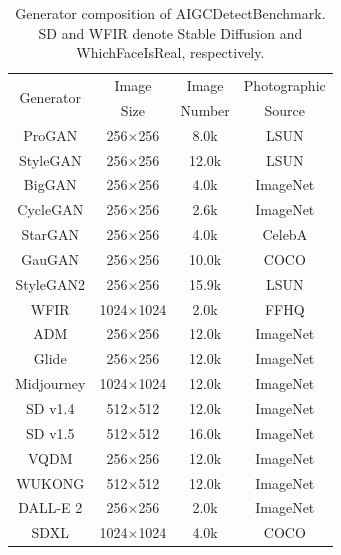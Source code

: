 \documentclass[letterpaper,journal]{IEEEtran}
\begin{document}
\begin{table}[t]
\caption{Generator composition of AIGCDetectBenchmark. SD and WFIR denote Stable Diffusion and WhichFaceIsReal, respectively.}
\label{tab:aigcdetectbenchmark}
\centering
\small
\renewcommand{\arraystretch}{1.04}
\setlength{\tabcolsep}{6pt}
\begin{tabular}{@{}cccc@{}}
\toprule
\multirow{2}{*}{Generator} & Image & Image & Photographic \\
 & Size & Number & Source \\
\midrule
ProGAN \cite{karras2018progan} & 256$\times$256 & 8.0k & LSUN \cite{yu2015lsun} \\
StyleGAN \cite{karras2019stylegan} & 256$\times$256 & 12.0k & LSUN \\
BigGAN \cite{brock2019biggan} & 256$\times$256 & 4.0k & ImageNet \cite{deng2009imagenet} \\
CycleGAN \cite{zhu2017cyclegan} & 256$\times$256 & 2.6k & ImageNet \\
StarGAN \cite{choi2018stargan} & 256$\times$256 & 4.0k & CelebA \cite{liu2015celeba} \\
GauGAN \cite{park2019spade} & 256$\times$256 & 10.0k & COCO \cite{lin2014coco} \\
StyleGAN2 \cite{karras2020stylegan2} & 256$\times$256 & 15.9k & LSUN \\
WFIR \cite{whichfaceisreal2023} & 1024$\times$1024 & 2.0k & FFHQ \cite{karras2019stylegan} \\
ADM \cite{dhariwal2021diffusion} & 256$\times$256 & 12.0k & ImageNet \\
Glide \cite{nichol2022glide} & 256$\times$256 & 12.0k & ImageNet \\
Midjourney \cite{midjourney2023} & 1024$\times$1024 & 12.0k & ImageNet \\
SD v1.4 \cite{rombach2022ldm} & 512$\times$512 & 12.0k & ImageNet \\
SD v1.5 \cite{rombach2022ldm} & 512$\times$512 & 16.0k & ImageNet \\
VQDM \cite{gu2022vqdm} & 256$\times$256 & 12.0k & ImageNet \\
WUKONG \cite{wukong2023} & 512$\times$512 & 12.0k & ImageNet \\
DALL-E 2 \cite{ramesh2022dalle2} & 256$\times$256 & 2.0k & ImageNet \\
SDXL \cite{podell2024sdxl} & 1024$\times$1024 & 4.0k & COCO \\
\bottomrule
\end{tabular}
\end{table}
\end{document}
